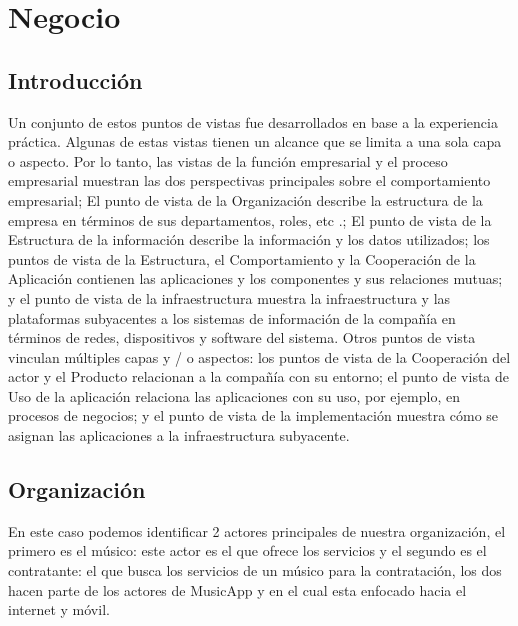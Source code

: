 \chapter{Negocio}

\section{Introducción}
Un conjunto de estos puntos de vistas fue desarrollados en base a la experiencia práctica. Algunas de estas vistas tienen un alcance que se limita a una sola capa o aspecto. Por lo tanto, las vistas de la función empresarial y el proceso empresarial muestran las dos perspectivas principales sobre el comportamiento empresarial; El punto de vista de la Organización describe la estructura de la empresa en términos de sus departamentos, roles, etc .; El punto de vista de la Estructura de la información describe la información y los datos utilizados; los puntos de vista de la Estructura, el Comportamiento y la Cooperación de la Aplicación contienen las aplicaciones y los componentes y sus relaciones mutuas; y el punto de vista de la infraestructura muestra la infraestructura y las plataformas subyacentes a los sistemas de información de la compañía en términos de redes, dispositivos y software del sistema. Otros puntos de vista vinculan múltiples capas y / o aspectos: los puntos de vista de la Cooperación del actor y el Producto relacionan a la compañía con su entorno; el punto de vista de Uso de la aplicación relaciona las aplicaciones con su uso, por ejemplo, en procesos de negocios; y el punto de vista de la implementación muestra cómo se asignan las aplicaciones a la infraestructura subyacente. 
\newpage

\section{Organización}
En este caso podemos identificar 2 actores principales de nuestra organización, el primero es el músico: este actor es el que ofrece los servicios y el segundo es el contratante: el que busca los servicios de un músico para la contratación, los dos hacen parte de los actores de MusicApp y en el cual esta enfocado hacia el internet y móvil.
